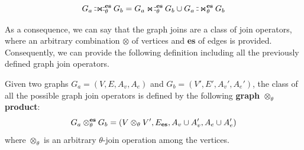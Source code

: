 \[G_a\fullouterjoin_\theta^{\textbf{\textup{es}}} G_b = G_a\rightouterjoin_\theta^{\textbf{\textup{es}}} G_b \cup G_a\leftouterjoin_\theta^{\textbf{\textup{es}}} G_b\]

As a consequence, we can say that the graph joins are a class of join operators, where an arbitrary combination $\otimes$ of vertices and \textbf{es} of edges is provided. Consequently, we can provide the following definition including all the previously defined graph join operators.

\begin{definition}\label{def:otimesjoin}
	\label{def:graphrightjointmes}
	Given two graphs $G_a=(V,E,A_v,A_e)$ and $G_b=(V',E',A_v',A_e')$, the class of all the possible graph join operators is defined by the following \textbf{graph $\otimes_\theta$ product}:
	\begin{equation*}
	G_a\otimes_\theta^{\textbf{\textup{es}}} G_b=(V\otimes_\theta V',E_{\textup{\textbf{es}}},A_v\cup A_v',A_e\cup A_e')
	\end{equation*}
	where $\otimes_\theta$ is an arbitrary $\theta$-join operation among the vertices.
\end{definition}



